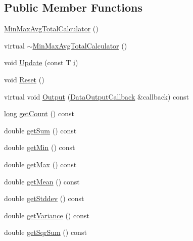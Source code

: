 \subsection*{Public Member Functions}
\begin{DoxyCompactItemize}
\item 
\hyperlink{classns3_1_1MinMaxAvgTotalCalculator_a1e435bea694215748e277af4853a8c21}{Min\+Max\+Avg\+Total\+Calculator} ()
\item 
virtual \hyperlink{classns3_1_1MinMaxAvgTotalCalculator_a32fd880a020a2ab29ae1fe107d1c5292}{$\sim$\+Min\+Max\+Avg\+Total\+Calculator} ()
\item 
void \hyperlink{classns3_1_1MinMaxAvgTotalCalculator_acad1745a8441535648ae95c7037a96e1}{Update} (const T \hyperlink{lte__uplink__power__control_8m_a6f6ccfcf58b31cb6412107d9d5281426}{i})
\item 
void \hyperlink{classns3_1_1MinMaxAvgTotalCalculator_a55f39b9cbe41f5ad31c9e37941334bc9}{Reset} ()
\item 
virtual void \hyperlink{classns3_1_1MinMaxAvgTotalCalculator_a18ad9d739106b8cdb36282c6e1d548f8}{Output} (\hyperlink{classns3_1_1DataOutputCallback}{Data\+Output\+Callback} \&callback) const 
\item 
\hyperlink{generate__test__data__lte__sinr_8m_a0eab6be67e93c3411f7a8b53cc297285}{long} \hyperlink{classns3_1_1MinMaxAvgTotalCalculator_a8f614c4a6a090665a75cea91a68d4486}{get\+Count} () const 
\item 
double \hyperlink{classns3_1_1MinMaxAvgTotalCalculator_ae18def40cc95735a4059b8aefb7ba827}{get\+Sum} () const 
\item 
double \hyperlink{classns3_1_1MinMaxAvgTotalCalculator_a6a506061da906ea3a1262a5f0394d68e}{get\+Min} () const 
\item 
double \hyperlink{classns3_1_1MinMaxAvgTotalCalculator_afb4430b9969e6acc05849bb9df444105}{get\+Max} () const 
\item 
double \hyperlink{classns3_1_1MinMaxAvgTotalCalculator_aba502282a75bae4c6f2f8f6fdc872cfe}{get\+Mean} () const 
\item 
double \hyperlink{classns3_1_1MinMaxAvgTotalCalculator_a7dfbeb8a90ff11304b32df5f1b49482a}{get\+Stddev} () const 
\item 
double \hyperlink{classns3_1_1MinMaxAvgTotalCalculator_a3dbf06a0a31cdab9dd780a6f263f6a55}{get\+Variance} () const 
\item 
double \hyperlink{classns3_1_1MinMaxAvgTotalCalculator_a5f7ce191a74642f91590ede3c5c0315a}{get\+Sqr\+Sum} () const 
\end{DoxyCompactItemize}
